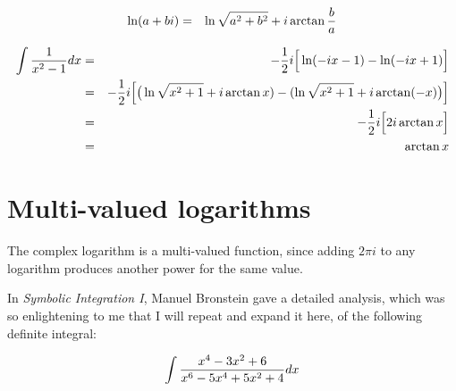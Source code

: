 \begin{eqnarray*}
\ln(a+bi) &=& \ln\sqrt{a^2+b^2} +i\arctan{b\over a} \\
\end{eqnarray*}


\begin{eqnarray*}
\int{1\over{x^2-1}}dx &=& -{1\over2}i\Big[\ln(-ix-1) - \ln(-ix+1)\Big] \\
&=& -{1\over2}i \Big[\big(\ln\sqrt{x^2+1} + i\arctan{x}) - (\ln\sqrt{x^2+1} + i\arctan(-x)\big) \Big] \\
&=& -{1\over2}i \Big[2 i\arctan{x} \Big] \\
&=& \arctan{x}
\end{eqnarray*}

\section{Multi-valued logarithms}

The complex logarithm is a multi-valued function, since adding $2\pi i$
to any logarithm produces another power for the same value.

In {\it Symbolic Integration I}, Manuel Bronstein gave a detailed
analysis, which was so enlightening to me that I will repeat
and expand it here, of the following definite integral:

\vfill\eject

$$\int {{x^4-3x^2+6}\over{x^6-5x^4+5x^2+4}} dx $$

